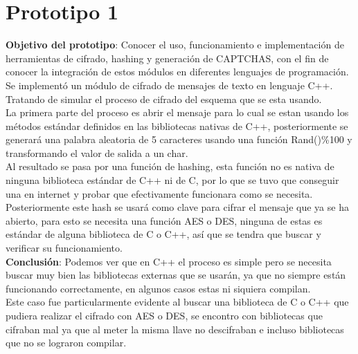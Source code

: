 \documentclass[12pt,oneside,onecolumn,openany]{report}
\begin{document}
\section{Prototipo 1}
\textbf{Objetivo del prototipo}:
Conocer el uso, funcionamiento e implementación de herramientas de cifrado, hashing y generación de CAPTCHAS, con el fin de conocer la integración de estos módulos en diferentes lenguajes de programación.\\
Se implementó un módulo de cifrado de mensajes de texto en lenguaje C++. Tratando de simular el proceso de cifrado del esquema que se esta usando.\\
La primera parte del proceso es abrir el mensaje para lo cual se estan usando los métodos estándar definidos en las bibliotecas nativas de C++, posteriormente se generará una palabra aleatoria de 5 caracteres usando una función Rand()\%100 y transformando el valor de salida a un char.\\
Al resultado se pasa por una función de hashing, esta función no es nativa de ninguna biblioteca estándar de C++ ni de C, por lo que se tuvo que conseguir una en internet y probar que efectivamente funcionara como se necesita.\\
Posteriormente este hash se usará como clave para cifrar el mensaje que ya se ha abierto, para esto se necesita una función AES o DES, ninguna de estas es estándar de alguna biblioteca de C o C++, así que se tendra que buscar y verificar su funcionamiento.\\


\textbf{Conclusión}:
Podemos ver que en C++ el proceso es simple pero se necesita buscar muy bien las bibliotecas externas que se usarán, ya que no siempre están funcionando correctamente, en algunos casos estas ni siquiera compilan.\\
Este caso fue particularmente evidente al buscar una biblioteca de C o C++ que pudiera realizar el cifrado con AES o DES, se encontro con bibliotecas que cifraban mal ya que al meter la misma llave no descifraban e incluso bibliotecas que no se lograron compilar.\\
\end{document}
